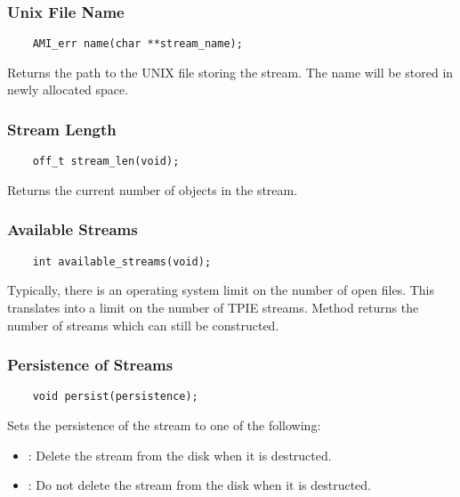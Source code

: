 \subsubsection{Unix File Name}

\begin{verbatim}
    AMI_err name(char **stream_name);
\end{verbatim}

Returns the path to the UNIX file storing the stream.  The
name will be stored in newly allocated space.

\subsubsection{Stream Length}

\begin{verbatim}
    off_t stream_len(void);
\end{verbatim}

Returns the current number of objects in the stream.

\subsubsection{Available Streams}
\begin{verbatim}
    int available_streams(void);    
\end{verbatim}

Typically, there is an operating system limit on the number
of open files. This translates into a limit on the number of
TPIE streams. Method  returns the
number of streams which can still be constructed.

\subsubsection{Persistence of Streams}
\label{member:ami-persist}
\begin{verbatim}
    void persist(persistence);
\end{verbatim}

Sets the persistence of the stream to one of the following:
\begin{itemize}
\item {}: Delete the stream from the disk when it is
  destructed.
\item {}: Do not delete the stream from the disk when
  it is destructed.
\end{itemize}

